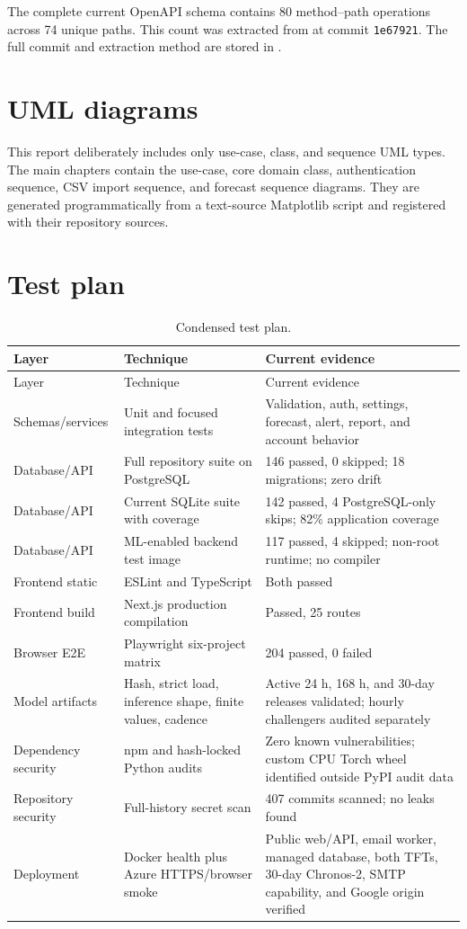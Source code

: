 The complete current OpenAPI schema contains 80 method--path operations across 74 unique paths. This count was extracted from  at commit \texttt{1e67921}. The full commit and extraction method are stored in .

\section{UML diagrams}

This report deliberately includes only use-case, class, and sequence UML types. The main chapters contain the use-case, core domain class, authentication sequence, CSV import sequence, and forecast sequence diagrams. They are generated programmatically from a text-source Matplotlib script and registered with their repository sources.

\section{Test plan}

\begin{longtable}{p{}p{}p{}}
\caption{Condensed test plan.}\\
\toprule
Layer & Technique & Current evidence \\
\midrule
\endfirsthead
\toprule
Layer & Technique & Current evidence \\
\midrule
\endhead
Schemas/services & Unit and focused integration tests & Validation, auth, settings, forecast, alert, report, and account behavior \\
Database/API & Full repository suite on PostgreSQL & 146 passed, 0 skipped; 18 migrations; zero drift \\
Database/API & Current SQLite suite with coverage & 142 passed, 4 PostgreSQL-only skips; 82\% application coverage \\
Database/API & ML-enabled backend test image & 117 passed, 4 skipped; non-root runtime; no compiler \\
Frontend static & ESLint and TypeScript & Both passed \\
Frontend build & Next.js production compilation & Passed, 25 routes \\
Browser E2E & Playwright six-project matrix & 204 passed, 0 failed \\
Model artifacts & Hash, strict load, inference shape, finite values, cadence & Active 24 h, 168 h, and 30-day releases validated; hourly challengers audited separately \\
Dependency security & npm and hash-locked Python audits & Zero known vulnerabilities; custom CPU Torch wheel identified outside PyPI audit data \\
Repository security & Full-history secret scan & 407 commits scanned; no leaks found \\
Deployment & Docker health plus Azure HTTPS/browser smoke & Public web/API, email worker, managed database, both TFTs, 30-day Chronos-2, SMTP capability, and Google origin verified \\
\bottomrule
\end{longtable}

